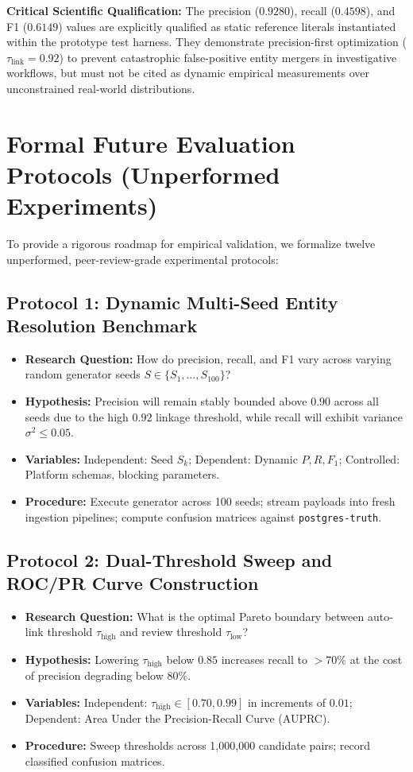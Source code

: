 \noindent\textbf{Critical Scientific Qualification:} The precision ($0.9280$), recall ($0.4598$), and F1 ($0.6149$) values are explicitly qualified as static reference literals instantiated within the prototype test harness. They demonstrate precision-first optimization ($\tau_{\text{link}} = 0.92$) to prevent catastrophic false-positive entity mergers in investigative workflows, but must not be cited as dynamic empirical measurements over unconstrained real-world distributions.

\section{Formal Future Evaluation Protocols (Unperformed Experiments)}
\label{sec:future_experiment_protocols}

To provide a rigorous roadmap for empirical validation, we formalize twelve unperformed, peer-review-grade experimental protocols:

\subsection{Protocol 1: Dynamic Multi-Seed Entity Resolution Benchmark}
\begin{itemize}[noitemsep]
    \item \textbf{Research Question:} How do precision, recall, and F1 vary across varying random generator seeds $S \in \{S_1, \dots, S_{100}\}$?
    \item \textbf{Hypothesis:} Precision will remain stably bounded above $0.90$ across all seeds due to the high $0.92$ linkage threshold, while recall will exhibit variance $\sigma^2 \le 0.05$.
    \item \textbf{Variables:} Independent: Seed $S_k$; Dependent: Dynamic $P, R, F_1$; Controlled: Platform schemas, blocking parameters.
    \item \textbf{Procedure:} Execute generator across 100 seeds; stream payloads into fresh ingestion pipelines; compute confusion matrices against \texttt{postgres-truth}.
\end{itemize}

\subsection{Protocol 2: Dual-Threshold Sweep and ROC/PR Curve Construction}
\begin{itemize}[noitemsep]
    \item \textbf{Research Question:} What is the optimal Pareto boundary between auto-link threshold $\tau_{\text{high}}$ and review threshold $\tau_{\text{low}}$?
    \item \textbf{Hypothesis:} Lowering $\tau_{\text{high}}$ below $0.85$ increases recall to $>70\%$ at the cost of precision degrading below $80\%$.
    \item \textbf{Variables:} Independent: $\tau_{\text{high}} \in [0.70, 0.99]$ in increments of $0.01$; Dependent: Area Under the Precision-Recall Curve (AUPRC).
    \item \textbf{Procedure:} Sweep thresholds across 1,000,000 candidate pairs; record classified confusion matrices.
\end{itemize}

